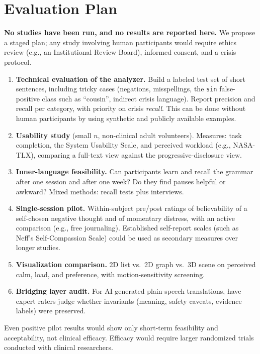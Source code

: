 \documentclass[11pt]{article}
\begin{document}
\section{Evaluation Plan}
\textbf{No studies have been run, and no results are reported here.} We propose a staged plan; any study involving human participants would require ethics review (e.g., an Institutional Review Board), informed consent, and a crisis protocol.
\begin{enumerate}
\item \textbf{Technical evaluation of the analyzer.} Build a labeled test set of short sentences, including tricky cases (negations, misspellings, the \texttt{sin} false-positive class such as ``cousin'', indirect crisis language). Report precision and recall per category, with priority on crisis \emph{recall}. This can be done without human participants by using synthetic and publicly available examples.
\item \textbf{Usability study} (small $n$, non-clinical adult volunteers). Measures: task completion, the System Usability Scale, and perceived workload (e.g., NASA-TLX), comparing a full-text view against the progressive-disclosure view.
\item \textbf{Inner-language feasibility.} Can participants learn and recall the grammar after one session and after one week? Do they find pauses helpful or awkward? Mixed methods: recall tests plus interviews.
\item \textbf{Single-session pilot.} Within-subject pre/post ratings of believability of a self-chosen negative thought and of momentary distress, with an active comparison (e.g., free journaling). Established self-report scales (such as Neff's Self-Compassion Scale) could be used as secondary measures over longer studies.
\item \textbf{Visualization comparison.} 2D list vs.\ 2D graph vs.\ 3D scene on perceived calm, load, and preference, with motion-sensitivity screening.
\item \textbf{Bridging layer audit.} For AI-generated plain-speech translations, have expert raters judge whether invariants (meaning, safety caveats, evidence labels) were preserved.
\end{enumerate}
Even positive pilot results would show only short-term feasibility and acceptability, not clinical efficacy. Efficacy would require larger randomized trials conducted with clinical researchers.
\end{document}
